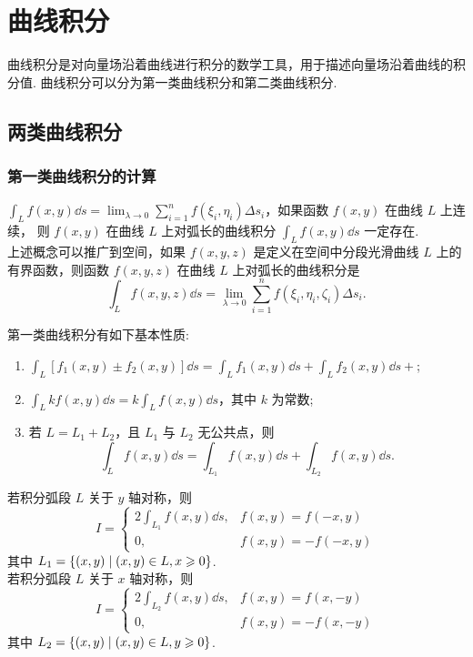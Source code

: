 \section{曲线积分}

曲线积分是对向量场沿着曲线进行积分的数学工具，用于描述向量场沿着曲线的积分值. 曲线积分可以分为第一类曲线积分和第二类曲线积分.

\subsection{两类曲线积分}

\subsubsection{第一类曲线积分的计算}

\begin{definition}
    $\displaystyle\int_L f(x,y)\dd s=\lim_{\lambda\to0}\sum_{i=1}^{n}f(\xi_i,\eta_i)\Delta s_i$，如果函数 $f(x,y)$ 在曲线 $L$ 上连续，
    则 $f(x,y)$ 在曲线 $L$ 上对弧长的曲线积分 $\displaystyle\int_L f(x,y)\dd s$ 一定存在.\\
    上述概念可以推广到空间，如果 $f(x,y,z)$ 是定义在空间中分段光滑曲线 $L$ 上的有界函数，则函数 $f(x,y,z)$ 在曲线 $L$ 上对弧长的曲线积分是
    $$\int_Lf(x,y,z)\dd s=\lim_{\lambda\to0}\sum_{i=1}^{n}f(\xi_i,\eta_i,\zeta_i)\Delta s_i.$$
\end{definition}

\begin{theorem}
    第一类曲线积分有如下基本性质:
    \begin{enumerate}[label=(\arabic{*})]
        \item $\displaystyle\int_L [f_1(x,y)\pm f_2(x,y)]\dd s=\int_L f_1(x,y)\dd s+\int_L f_2(x,y)\dd s+$;
        \item $\displaystyle\int_L kf(x,y)\dd s=k\int_L f(x,y)\dd s$，其中 $k$ 为常数;
        \item 若 $L=L_1+L_2$，且 $L_1$ 与 $L_2$ 无公共点，则 $$\int_Lf(x,y)\dd s=\int_{L_1}f(x,y)\dd s+\int_{L_2}f(x,y)\dd s. $$
    \end{enumerate}
\end{theorem}

\begin{theorem}[轴对称性]
    若积分弧段 $L$ 关于 $y$ 轴对称，则
    $$I=\begin{cases}
            2\displaystyle \int_{L_1}f(x,y)\dd s, & f(x,y)=f(-x,y)  \\
            0,                                    & f(x,y)=-f(-x,y)
        \end{cases}$$
    其中 $L_1=\qty{(x,y)\mid (x,y)\in L,x\geqslant 0}$.\\
    若积分弧段 $L$ 关于 $x$ 轴对称，则
    $$I=\begin{cases}
            2\displaystyle\int_{L_2}f(x,y)\dd s, & f(x,y)=f(x,-y)  \\
            0,                                   & f(x,y)=-f(x,-y)
        \end{cases}$$
    其中 $L_2=\qty{(x,y)\mid (x,y)\in L,y\geqslant 0}$.
\end{theorem}

